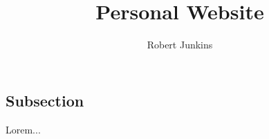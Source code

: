\documentclass{article}
\title{%
	Personal Website\\[2ex] \large
}
\author{Robert Junkins}
\begin{document}
\maketitle
\tableofcontents
\newpage
\section{}
\subsection{Subsection}

Lorem...
\iffalse
\begin{center}
	\texttt{[image: image\_name]}
\end{center}
\fi
\end{document}
